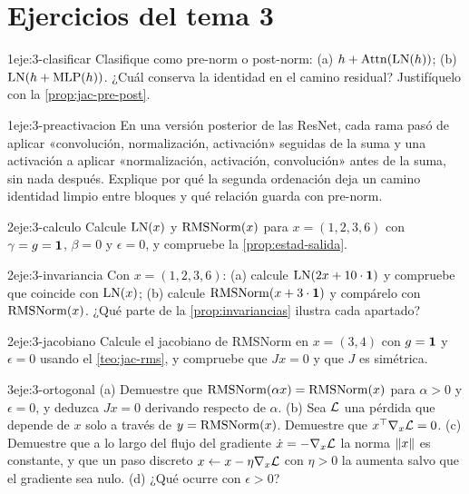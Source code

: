 \section*{Ejercicios del tema 3}

\begin{ejercicio}{1}{eje:3-clasificar}
Clasifique como pre-norm o post-norm: (a) $h+\operatorname{Attn}(\operatorname{LN}(h))$; (b) $\operatorname{LN}(h+\operatorname{MLP}(h))$. ¿Cuál conserva la identidad en el camino residual? Justifíquelo con la \cref{prop:jac-pre-post}.
\end{ejercicio}

\begin{ejercicio}{1}{eje:3-preactivacion}
En una versión posterior de las ResNet, cada rama pasó de aplicar «convolución, normalización, activación» seguidas de la suma y una activación a aplicar «normalización, activación, convolución» antes de la suma, sin nada después. Explique por qué la segunda ordenación deja un camino identidad limpio entre bloques y qué relación guarda con pre-norm.
\end{ejercicio}

\begin{ejercicio}{2}{eje:3-calculo}
Calcule $\operatorname{LN}(x)$ y $\operatorname{RMSNorm}(x)$ para $x=(1,2,3,6)$ con $\gamma=g=\mathbf{1}$, $\beta=0$ y $\epsilon=0$, y compruebe la \cref{prop:estad-salida}.
\end{ejercicio}

\begin{ejercicio}{2}{eje:3-invariancia}
Con $x=(1,2,3,6)$: (a) calcule $\operatorname{LN}(2x+10\cdot\mathbf{1})$ y compruebe que coincide con $\operatorname{LN}(x)$; (b) calcule $\operatorname{RMSNorm}(x+3\cdot\mathbf{1})$ y compárelo con $\operatorname{RMSNorm}(x)$. ¿Qué parte de la \cref{prop:invariancias} ilustra cada apartado?
\end{ejercicio}

\begin{ejercicio}{2}{eje:3-jacobiano}
Calcule el jacobiano de RMSNorm en $x=(3,4)$ con $g=\mathbf{1}$ y $\epsilon=0$ usando el \cref{teo:jac-rms}, y compruebe que $Jx=0$ y que $J$ es simétrica.
\end{ejercicio}

\begin{ejercicio}{3}{eje:3-ortogonal}
(a) Demuestre que $\operatorname{RMSNorm}(\alpha x)=\operatorname{RMSNorm}(x)$ para $\alpha>0$ y $\epsilon=0$, y deduzca $Jx=0$ derivando respecto de $\alpha$. (b) Sea $\mathcal{L}$ una pérdida que depende de $x$ solo a través de $y=\operatorname{RMSNorm}(x)$. Demuestre que $x^{\top}\nabla_x\mathcal{L}=0$. (c) Demuestre que a lo largo del flujo del gradiente $\dot x=-\nabla_x\mathcal{L}$ la norma $\lVert x\rVert$ es constante, y que un paso discreto $x\leftarrow x-\eta\nabla_x\mathcal{L}$ con $\eta>0$ la aumenta salvo que el gradiente sea nulo. (d) ¿Qué ocurre con $\epsilon>0$?
\end{ejercicio}
